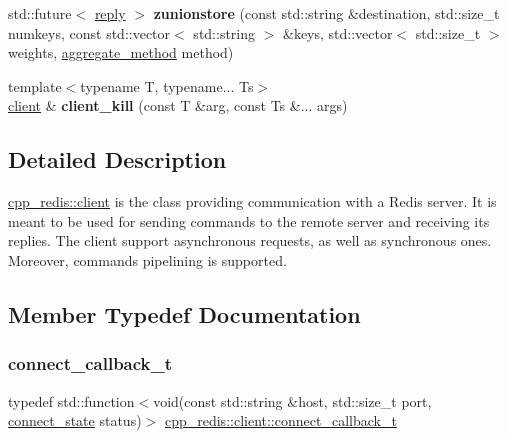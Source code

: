 \begin{DoxyCompactItemize}
std\+::future$<$ \mbox{\hyperlink{classcpp__redis_1_1reply}{reply}} $>$ {\bfseries zunionstore} (const std\+::string \&destination, std\+::size\+\_\+t numkeys, const std\+::vector$<$ std\+::string $>$ \&keys, std\+::vector$<$ std\+::size\+\_\+t $>$ weights, \mbox{\hyperlink{classcpp__redis_1_1client_aa197ca5b36da793c701d3ba388ec4946}{aggregate\+\_\+method}} method)
\item 
\mbox{\label{classcpp__redis_1_1client_ab3095cf010e10e9aa0b17a4408e6652e}} 
{\footnotesize template$<$typename T, typename... Ts$>$ }\\\mbox{\hyperlink{classcpp__redis_1_1client}{client}} \& {\bfseries client\+\_\+kill} (const T \&arg, const Ts \&... args)
\end{DoxyCompactItemize}


\subsection{Detailed Description}
\mbox{\hyperlink{classcpp__redis_1_1client}{cpp\+\_\+redis\+::client}} is the class providing communication with a Redis server. It is meant to be used for sending commands to the remote server and receiving its replies. The client support asynchronous requests, as well as synchronous ones. Moreover, commands pipelining is supported. 

\subsection{Member Typedef Documentation}
\mbox{\label{classcpp__redis_1_1client_a8e8f308847caf0b9ce06b817253c65c7}} 
\subsubsection{\texorpdfstring{connect\+\_\+callback\+\_\+t}{connect\_callback\_t}}
{\footnotesize\ttfamily typedef std\+::function$<$void(const std\+::string \&host, std\+::size\+\_\+t port, \mbox{\hyperlink{classcpp__redis_1_1client_a2512bd48dd45391249a69bd720c1e4da}{connect\+\_\+state}} status)$>$ \mbox{\hyperlink{classcpp__redis_1_1client_a8e8f308847caf0b9ce06b817253c65c7}{cpp\+\_\+redis\+::client\+::connect\+\_\+callback\+\_\+t}}}

